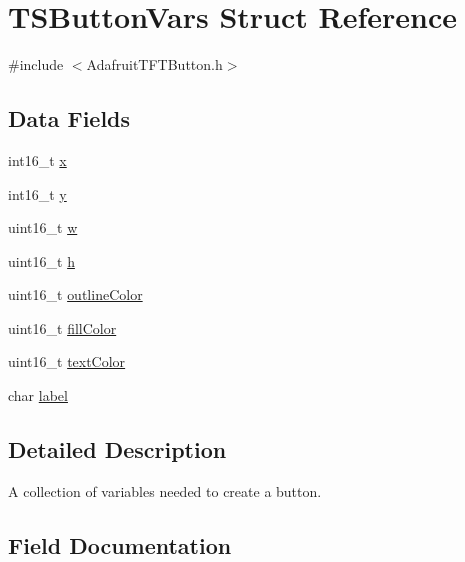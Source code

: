 \hypertarget{struct_t_s_button_vars}{}\section{T\+S\+Button\+Vars Struct Reference}
\label{struct_t_s_button_vars}


{\ttfamily \#include $<$Adafruit\+T\+F\+T\+Button.\+h$>$}

\subsection*{Data Fields}
\begin{DoxyCompactItemize}
\item 
int16\+\_\+t \mbox{\hyperlink{struct_t_s_button_vars_adabcf574daf6ec1fae86877a1d4ca008}{x}}
\item 
int16\+\_\+t \mbox{\hyperlink{struct_t_s_button_vars_af8786da14bcada953f31f2399fe6d20a}{y}}
\item 
uint16\+\_\+t \mbox{\hyperlink{struct_t_s_button_vars_afee576f3d2c40433495e7e26fe49ebee}{w}}
\item 
uint16\+\_\+t \mbox{\hyperlink{struct_t_s_button_vars_aec40efe13eac02c70a8a88d2a1571550}{h}}
\item 
uint16\+\_\+t \mbox{\hyperlink{struct_t_s_button_vars_a0655af30b92e30676d275d6e400a8d17}{outline\+Color}}
\item 
uint16\+\_\+t \mbox{\hyperlink{struct_t_s_button_vars_aafd16f5ca997baf2945778dc05b8724b}{fill\+Color}}
\item 
uint16\+\_\+t \mbox{\hyperlink{struct_t_s_button_vars_ac365a934d553142e3b63292679e3503f}{text\+Color}}
\item 
char \mbox{\hyperlink{struct_t_s_button_vars_a0dfa1af86d8ab0bc629c1b6a7b408194}{label}}
\end{DoxyCompactItemize}


\subsection{Detailed Description}
A collection of variables needed to create a button. 

\subsection{Field Documentation}
\mbox{\label{struct_t_s_button_vars_aafd16f5ca997baf2945778dc05b8724b}} 
